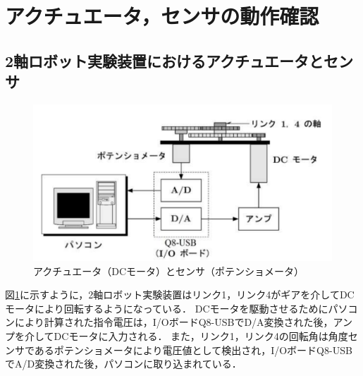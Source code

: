 \section{アクチュエータ，センサの動作確認}

\subsection{2軸ロボット実験装置におけるアクチュエータとセンサ}

\begin{figure}[H]
    \centering
    \includegraphics[width=0.8\linewidth]{figure/actuator_sensor.pdf}
    \caption{アクチュエータ（DCモータ）とセンサ（ポテンショメータ）}
    \label{fig:actuator_sensor}
\end{figure}

図\ref{fig:actuator_sensor}に示すように，2軸ロボット実験装置はリンク1，リンク4がギアを介してDCモータにより回転するようになっている．
DCモータを駆動させるためにパソコンにより計算された指令電圧は，I/OボードQ8-USBでD/A変換された後，アンプを介してDCモータに入力される．
また，リンク1，リンク4の回転角は角度センサであるポテンショメータにより電圧値として検出され，I/OボードQ8-USBでA/D変換された後，パソコンに取り込まれている．
